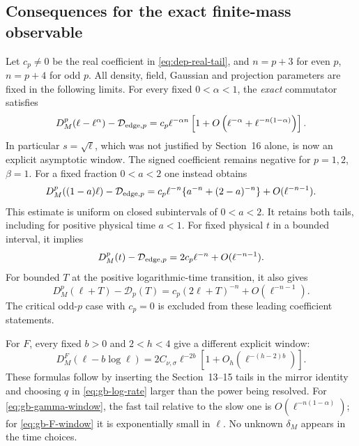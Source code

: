 \subsection{Consequences for the exact finite-mass observable}
Let $c_p\ne0$ be the real coefficient in \eqref{eq:dep-real-tail},
and $n=p+3$ for even $p$, $n=p+4$ for odd $p$. All density, field,
Gaussian and projection parameters are fixed in the following limits.
For every fixed $0<\alpha<1$, the \emph{exact} commutator satisfies
\begin{equation}
 D_M^p(\ell-\ell^\alpha)-\mathcal D_{{\rm edge},p}
 =c_p\ell^{-\alpha n}
  \left[1+O\left(\ell^{-\alpha}
                         +\ell^{-n(1-\alpha)}\right)\right].
 \label{eq:gb-gamma-window}
\end{equation}
In particular $s=\sqrt\ell$, which was not justified by Section~16
alone, is now an explicit asymptotic window. The signed coefficient
remains negative for $p=1,2$, $\beta=1$.
For a fixed fraction $0<a<2$ one instead obtains
\begin{equation}
 D_M^p((1-a)\ell)-\mathcal D_{{\rm edge},p}
 =c_p\ell^{-n}\{a^{-n}+(2-a)^{-n}\}
                         +O(\ell^{-n-1}).
 \label{eq:gb-gamma-fraction}
\end{equation}
This estimate is uniform on closed subintervals of $0<a<2$.
It retains both tails, including for positive physical time $a<1$.
For fixed physical $t$ in a bounded interval, it implies
\begin{equation}
 D_M^p(t)-\mathcal D_{{\rm edge},p}
 =2c_p\ell^{-n}+O(\ell^{-n-1}).
 \label{eq:gb-fixed-time-rate}
\end{equation}
For bounded $T$ at the positive logarithmic-time transition, it also gives
\begin{equation}
 D_M^p(\ell+T)-\mathcal D_p(T)
 =c_p(2\ell+T)^{-n}+O(\ell^{-n-1}).
 \label{eq:gb-fixed-T-rate}
\end{equation}
The critical odd-$p$ case with $c_p=0$ is excluded from these leading
coefficient statements.

For $F$, every fixed $b>0$ and $2<h<4$ give a different explicit window:
\begin{equation}
 D_M^F(\ell-b\log\ell)
 =2C_{\nu,\sigma}\ell^{-2b}
                  [1+O_h(\ell^{-(h-2)b})].
 \label{eq:gb-F-window}
\end{equation}
These formulas follow by inserting the Section~13--15 tails in the
mirror identity and choosing $q$ in \eqref{eq:gb-log-rate} larger than
the power being resolved. For \eqref{eq:gb-gamma-window}, the fast tail
relative to the slow one is $O(\ell^{-n(1-\alpha)})$; for
\eqref{eq:gb-F-window} it is exponentially small in $\ell$.
No unknown $\delta_M$ appears in the time choices.

